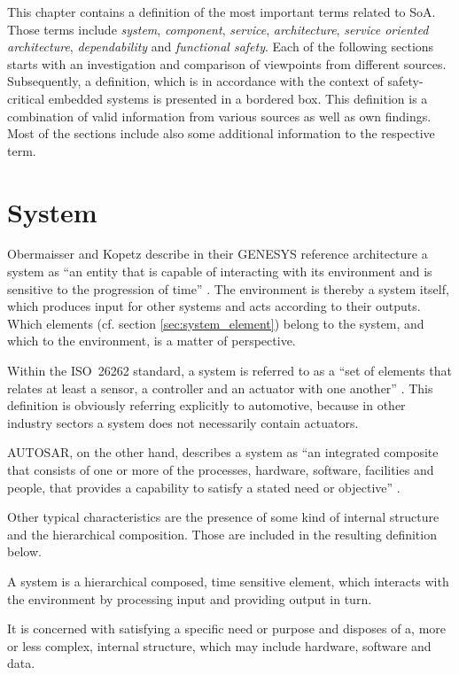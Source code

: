 \label{ch:methods}

This chapter contains a definition of the most important terms related to SoA. Those terms include \emph{system}, \emph{component}, \emph{service}, \emph{architecture}, \emph{service oriented architecture}, \emph{dependability} and \emph{functional safety}. Each of the following sections starts with an investigation and comparison of viewpoints from different sources. Subsequently, a definition, which is in accordance with the context of safety-critical embedded systems is presented in a bordered box. This definition is a combination of valid information from various sources as well as own findings. Most of the sections include also some additional information to the respective term.

\section{System}
\label{ch:system}
Obermaisser and Kopetz describe in their GENESYS reference architecture a system as ``an entity that is capable of interacting with its environment and is sensitive to the progression of time'' \cite[p.7]{genesys}. The environment is thereby a system itself, which produces input for other systems and acts according to their outputs. Which elements (cf. section \ref{sec:system_element}) belong to the system, and which to the environment, is a matter of perspective. 

Within the \mbox{ISO 26262} standard, a system is referred to as a ``set of elements that relates at least a sensor, a controller and an actuator with one another'' \cite{iso26262:1}. This definition is obviously referring explicitly to automotive, because in other industry sectors a system does not necessarily contain actuators.

\mbox{AUTOSAR}, on the other hand, describes a system as ``an integrated composite that consists of one or more of the processes, hardware, software, facilities and people, that provides a capability to satisfy a stated need or objective'' \cite{autosar_glossary}.

Other typical characteristics are the presence of some kind of internal structure and the hierarchical composition. Those are included in the resulting definition below.

\begin{myquote}
A system is a hierarchical composed, time sensitive element, which interacts with the environment by processing input and providing output in turn.

It is concerned with satisfying a specific need or purpose and disposes of a, more or less complex, internal structure, which may include hardware, software and data.
\end{myquote}

